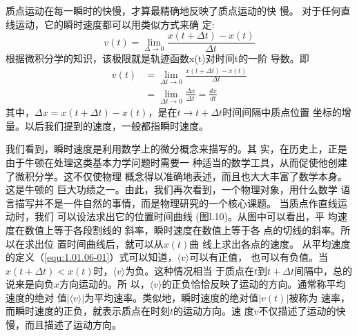 质点运动在每一瞬时的快慢，才算最精确地反映了质点运动的快
慢。
    对于任何直线运动，它的瞬时速度都可以用类似方式来确
定:
$$
v(t)=\lim _{\Delta \rightarrow 0} \frac{x(t+\Delta t)-x(t)}{\Delta t}
$$
根据微积分学的知识，该极限就是轨迹函数x(t)对时间t的一阶
导数。即
\begin{equation}
    \begin{aligned}
        v(t) &=\lim _{\Delta t \rightarrow 0} \frac{x(t+\Delta t)-x(t)}{\Delta t} \\
        &=\lim _{\Delta t \rightarrow 0} \frac{\Delta x}{\Delta t}=\frac{d x}{d t} \label{equ:1.01.06-03}
    \end{aligned}
\end{equation}
其中，$\Delta x=x(t+\Delta t)-x(t)$，是在$t\rightarrow t+\Delta t$时间间隔中质点位置
坐标的增量。以后我们提到的速度，一般都指瞬时速度。

    我们看到，瞬时速度是利用数学上的微分概念来描写的。其
实，在历史上，正是由于牛顿在处理这类基本力学问题时需要一
种适当的数学工具，从而促使他创建了微积分学。这不仅使物理
概念得以准确地表述，而且也大大丰富了数学本身。这是牛顿的
巨大功绩之一。由此，我们再次看到，一个物理对象，用什么数学
语言描写并不是一件自然的事情，而是物理研究的一个核心课题。
    当质点作直线运动时，我们
可以设法求出它的位置时间曲线
(图l.10)。从图中可以看出，平
均速度在数值上等于各段割线的
斜率，瞬时速度在数值上等于各
点的切线的斜率。所以在求出位
置时间曲线后，就可以从$x(t)$曲
线上求出各点的速度。
  从平均速度的定义（\ref{equ:1.01.06-01}）式可以知道，$\langle v\rangle$可以有正值，
也可以有负值。当$x(t+\Delta t)<x(t)$时，$\langle v\rangle$为负。这种情况相当
于质点在$t$到$t+\Delta t$间隔中，总的说来是向负$x$方向运动的。所
以，$\langle v\rangle$的正负恰恰反映了运动的方向。通常称平均速度的绝对
值$|\langle v\rangle|$为平均速率。类似地，瞬时速度的绝对值$|v(t)|$被称为
速率，而瞬时速度的正负，就表示质点在时刻$t$的运动方向。速
度$v$不仅描述了运动的快慢，而且描述了运动方向。
